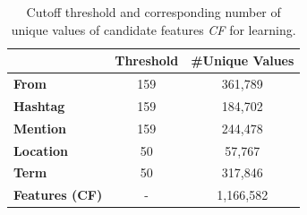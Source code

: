 \documentclass[letterpaper]{article}
\begin{document}
\begin{table}[t!]
\centering
{\footnotesize
\begin{tabular}{|l|c|c|}
\hline
 & \textbf{Threshold} & \textbf{\#Unique Values} \\ \hline \hline
\textbf{From} & 159 & 361,789 \\ \hline
\textbf{Hashtag} & 159 & 184,702 \\ \hline
\textbf{Mention} & 159 & 244,478 \\ \hline
\textbf{Location} & 50 & 57,767 \\ \hline
\textbf{Term} & 50 & 317,846 \\ \hline \hline
\textbf{Features (CF)} & - & 1,166,582 \\ \hline
\end{tabular}
}
\caption{Cutoff threshold and corresponding number of unique values of candidate features \textit{CF} for learning.
}
\label{table:learningFeatures}
\end{table}
\end{document}
